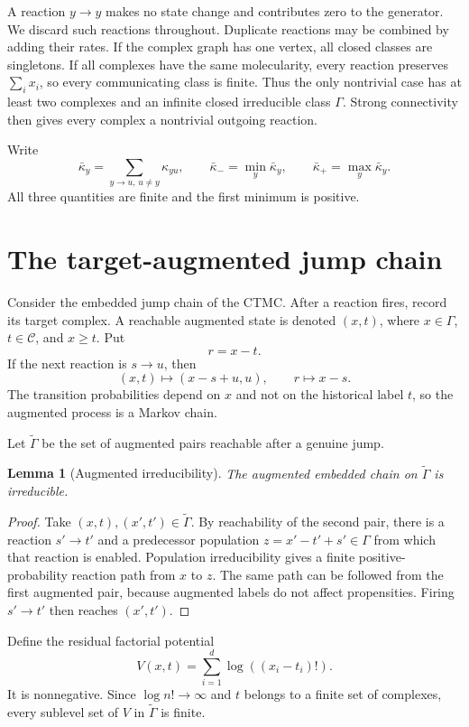 \documentclass[11pt]{article}
\newtheorem{lemma}[theorem]{Lemma}
\theoremstyle{definition}
\newcommand{\Ccal}{\mathcal C}
\newcommand{\Gamm}{\Gamma}
\newcommand{\wtG}{\widetilde\Gamma}
\begin{document}
A reaction \(y\to y\) makes no state change and contributes zero to the
generator.  We discard such reactions throughout.  Duplicate reactions may
be combined by adding their rates.  If the complex graph has one vertex, all
closed classes are singletons.  If all complexes have the same molecularity,
every reaction preserves \(\sum_i x_i\), so every communicating class is
finite.  Thus the only nontrivial case has at least two complexes and an
infinite closed irreducible class \(\Gamm\).  Strong connectivity then gives
every complex a nontrivial outgoing reaction.

Write
\[
  \bar\kappa_y=\sum_{y\to u,\,u\ne y}\kappa_{yu},
  \qquad
  \bar\kappa_- = \min_y\bar\kappa_y,
  \qquad
  \bar\kappa_+ = \max_y\bar\kappa_y.
\]
All three quantities are finite and the first minimum is positive.

\section{The target-augmented jump chain}

Consider the embedded jump chain of the CTMC.  After a reaction fires, record
its target complex.  A reachable augmented state is denoted \((x,t)\), where
\(x\in\Gamm\), \(t\in\Ccal\), and \(x\geq t\).  Put
\[
  r=x-t.
\]
If the next reaction is \(s\to u\), then
\[
  (x,t)\longmapsto (x-s+u,u),
  \qquad
  r\longmapsto x-s.
\]
The transition probabilities depend on \(x\) and not on the historical label
\(t\), so the augmented process is a Markov chain.

Let \(\wtG\) be the set of augmented pairs reachable after a genuine jump.

\begin{lemma}[Augmented irreducibility]\label{lem:aug-irr}
The augmented embedded chain on \(\wtG\) is irreducible.
\end{lemma}

\begin{proof}
Take \((x,t),(x',t')\in\wtG\).  By reachability of the second pair, there is
a reaction \(s'\to t'\) and a predecessor population
\(z=x'-t'+s'\in\Gamm\) from which that reaction is enabled.  Population
irreducibility gives a finite positive-probability reaction path from \(x\)
to \(z\).  The same path can be followed from the first augmented pair,
because augmented labels do not affect propensities.  Firing
\(s'\to t'\) then reaches \((x',t')\).
\end{proof}

Define the residual factorial potential
\begin{equation}\label{eq:V}
  V(x,t)=\sum_{i=1}^d \log((x_i-t_i)!).
\end{equation}
It is nonnegative.  Since \(\log n!\to\infty\) and \(t\) belongs to a finite
set of complexes, every sublevel set of \(V\) in \(\wtG\) is finite.
\end{document}
